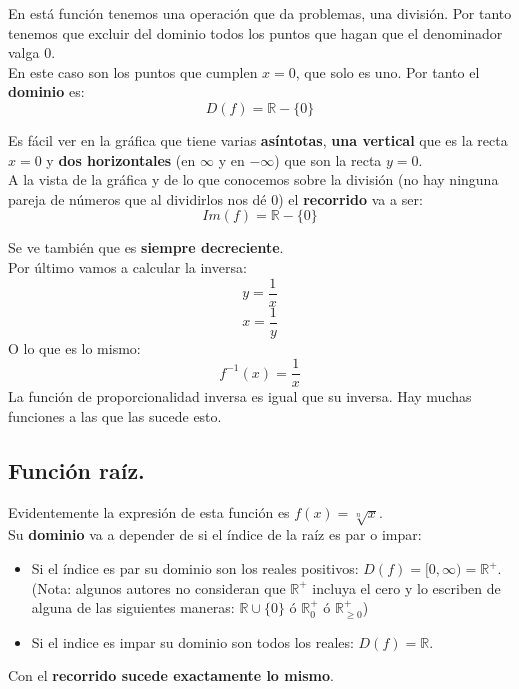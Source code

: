 \documentclass[a4paper,11pt,answers]{exam}
\begin{document}
En está función tenemos una operación que da problemas, una división. Por tanto tenemos que excluir del dominio todos los puntos que hagan que el denominador valga 0.\\
En este caso son los puntos que cumplen $x=0$, que solo es uno. Por tanto el \textbf{dominio} es:
\[D(f) = \mathbb{R} - \{0\}\]

Es fácil ver en la gráfica que tiene varias \textbf{asíntotas}, \textbf{una vertical} que es la recta $x=0$ y \textbf{dos horizontales} (en $\infty$ y en $-\infty$) que son la recta $y = 0$.\\

A la vista de la gráfica y de lo que conocemos sobre la división (no hay ninguna pareja de números que al dividirlos nos dé 0) el \textbf{recorrido} va a ser:
\[Im(f) = \mathbb{R} - \{0\}\]

Se ve también que es \textbf{siempre decreciente}.\\

Por último vamos a calcular la inversa:
\[y = \frac{1}{x}\]
\[x = \frac{1}{y}\]
O lo que es lo mismo:
\[f^{-1}(x) = \frac{1}{x}\]
La función de proporcionalidad inversa es igual que su inversa. Hay muchas funciones a las que las sucede esto.

\subsection{Función raíz.}
Evidentemente la expresión de esta función es $f(x) = \sqrt[n]{x}$.\\
Su \textbf{dominio} va a depender de si el índice de la raíz es par o impar:
\begin{itemize}
	\item Si el índice es par su dominio son los reales positivos: $D(f) = [0, \infty) = \mathbb{R}^{+}$.\\
	(Nota: algunos autores no consideran que $\mathbb{R}^{+}$ incluya el cero y lo escriben de alguna de las siguientes maneras: $\mathbb{R} \cup \{0\}$ ó $\mathbb{R}^{+}_0$ ó $\mathbb{R}^{+}_{\geq 0}$)
	\item Si el indice es impar su dominio son todos los reales: $D(f) = \mathbb{R}$.
\end{itemize}
Con el \textbf{recorrido sucede exactamente lo mismo}.\\
\end{document}
